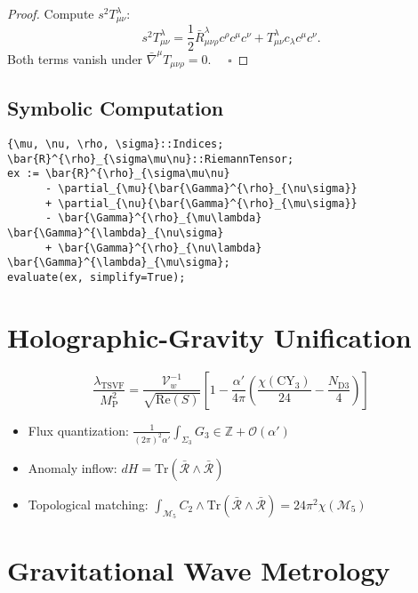 \documentclass[12pt, onecolumn]{article}
\theoremstyle{definition}
\newcommand{\tsvf}{\lambda_{\mathrm{TSVF}}}
\newcommand{\Mp}{M_{\mathrm{P}}}
\numberwithin{equation}{section}
\begin{document}
\begin{appendices}
\begin{proof}
Compute \( s^2 T^\lambda_{\mu\nu} \):
\[
s^2 T^\lambda_{\mu\nu} = \frac{1}{2} \bar{R}^\lambda_{\mu\nu\rho} c^\rho c^\mu c^\nu + T^\lambda_{\mu\nu} c_\lambda c^\mu c^\nu.
\]
Both terms vanish under \( \bar{\nabla}^\mu T_{\mu\nu\rho} = 0 \). $\quad \square$
\end{proof}

\subsection{Symbolic Computation}\label{sec:cadabra}
\begin{verbatim}
{\mu, \nu, \rho, \sigma}::Indices;
\bar{R}^{\rho}_{\sigma\mu\nu}::RiemannTensor;
ex := \bar{R}^{\rho}_{\sigma\mu\nu} 
      - \partial_{\mu}{\bar{\Gamma}^{\rho}_{\nu\sigma}} 
      + \partial_{\nu}{\bar{\Gamma}^{\rho}_{\mu\sigma}} 
      - \bar{\Gamma}^{\rho}_{\mu\lambda} \bar{\Gamma}^{\lambda}_{\nu\sigma} 
      + \bar{\Gamma}^{\rho}_{\nu\lambda} \bar{\Gamma}^{\lambda}_{\mu\sigma};
evaluate(ex, simplify=True);
\end{verbatim}


\section{Holographic-Gravity Unification}  
\label{app:holography}  

\begin{equation}  
\frac{\tsvf}{\Mp^2} = \frac{\mathcal{V}_w^{-1}}{\sqrt{\mathrm{Re}(S)}} \left[1 - \frac{\alpha'}{4\pi}\left(\frac{\chi(\text{CY}_3)}{24} - \frac{N_{\text{D3}}}{4}\right)\right]
\end{equation}

\begin{itemize}
\item Flux quantization: $\frac{1}{(2\pi)^2\alpha'} \int_{\Sigma_3} G_3 \in \mathbb{Z} + \mathcal{O}(\alpha')$
\item Anomaly inflow: $dH = \mathrm{Tr}(\bar{\mathcal{R}} \wedge \bar{\mathcal{R}})$
\item Topological matching: $\int_{\mathcal{M}_5} C_2 \wedge \mathrm{Tr}(\bar{\mathcal{R}} \wedge \bar{\mathcal{R}}) = 24\pi^2\chi(\mathcal{M}_5)$
\end{itemize}

\section{Gravitational Wave Metrology}  
\label{app:gw_metrology}  


\end{appendices}
\end{document}
